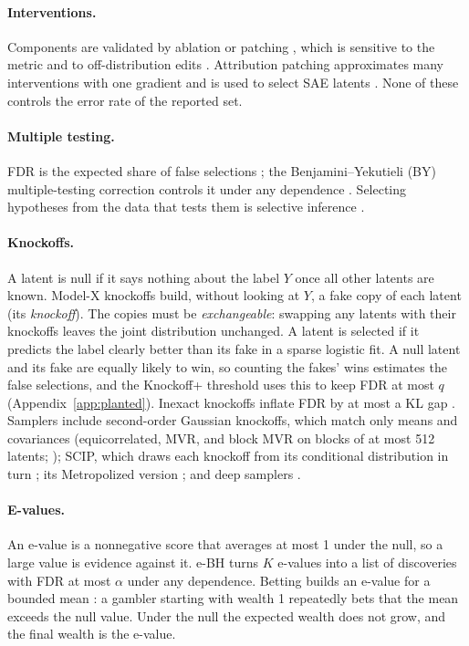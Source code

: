 \paragraph{Interventions.} Components are validated by ablation or patching
\citep{wang2023interpretability, heimersheim2024patching}, which is sensitive to the metric
\citep{zhang2024towards} and to off-distribution edits \citep{makelov2024illusion}. Attribution patching
approximates many interventions with one gradient \citep{syed2023attribution, kramar2024atp} and is used
to select SAE latents \citep{marks2025sparse}. None of these controls the error rate of the reported set.

\paragraph{Multiple testing.} FDR is the expected share of false selections
\citep{benjamini1995controlling}; the Benjamini--Yekutieli (BY) multiple-testing correction controls it under any
dependence \citep{benjamini2001control}. Selecting hypotheses from the data that tests them is selective inference
\citep{berk2013valid, taylor2015statistical}.

\paragraph{Knockoffs.} A latent is null if it says nothing about the label $Y$ once all other latents are known.
Model-X knockoffs \citep{candes2018panning} build, without looking at $Y$, a fake copy of each latent (its
\emph{knockoff}). The copies must be \emph{exchangeable}: swapping any latents with their knockoffs leaves the joint
distribution unchanged. A latent is selected if it predicts the label clearly better than its fake in a sparse
logistic fit. A null latent and its fake are equally likely to win, so counting the fakes' wins estimates the false
selections, and the Knockoff+ threshold \citep{barber2015controlling} uses this to keep FDR at most $q$
(Appendix~\ref{app:planted}). Inexact knockoffs inflate FDR by at most a KL gap \citep{barber2020}. Samplers include
second-order Gaussian knockoffs, which match only means and covariances (equicorrelated, MVR, and block MVR on blocks of at
most 512 latents; \citealp{spector2022powerful}); SCIP, which draws each knockoff from its conditional distribution in turn
\citep{candes2018panning}; its Metropolized version \citep{bates2021metropolized}; and deep samplers \citep{romano2020deep}.

\paragraph{E-values.} An e-value is a nonnegative score that averages at most 1 under the null, so a large value is
evidence against it. e-BH \citep{wang2022evalues} turns $K$ e-values into a list of discoveries with FDR at most $\alpha$
under any dependence. Betting builds an e-value for a bounded mean \citep{waudbysmith2024betting}: a gambler starting
with wealth 1 repeatedly bets that the mean exceeds the null value. Under the null the expected wealth does not grow, and
the final wealth is the e-value.


